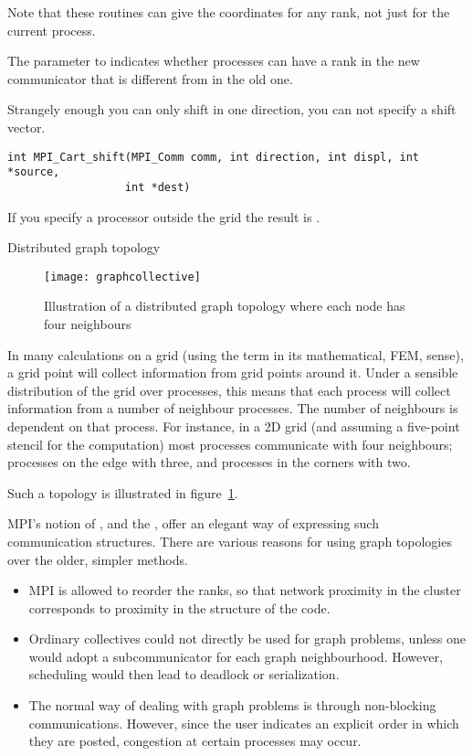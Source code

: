 Note that these routines can give the coordinates for any rank,
not just for the current process.
%

The  parameter to 
indicates whether processes can have a rank
in the new communicator that is different from in the old one.

Strangely enough you can only shift in one direction, you can not
specify a shift vector.
\begin{lstlisting}
int MPI_Cart_shift(MPI_Comm comm, int direction, int displ, int *source, 
                  int *dest)
\end{lstlisting}
If you specify a processor outside the grid
the result is .


 {Distributed graph topology}
\label{sec:mpi-dist-graph}

\begin{figure}
  \texttt{[image: graphcollective]}
  \caption{Illustration of a distributed graph topology where each
    node has four neighbours}
  \label{fig:graphcollective}
\end{figure}

In many calculations on a grid (using the term in its mathematical,
\ac{FEM}, sense), a grid point will collect information from grid
points around it. Under a sensible distribution of the grid over
processes, this means that each process will collect information from
a number of neighbour processes. The number of 
neighbours is dependent on that process. For instance, in a 2D
grid (and assuming a five-point stencil for the computation) most
processes communicate with four neighbours; processes on the edge with
three, and processes in the corners with two.

Such a topology is illustrated in figure~\ref{fig:graphcollective}.

MPI's notion of , and the
, offer an elegant way of
expressing such communication structures. There are various reasons
for using graph topologies over the older, simpler methods.
\begin{itemize}
\item MPI is allowed to reorder the ranks, so that network proximity
  in the cluster corresponds to proximity in the structure of the
  code.
\item Ordinary collectives could not directly be used for graph
  problems, unless one would adopt a subcommunicator for each graph
  neighbourhood. However, scheduling would then lead to deadlock or
  serialization.
\item The normal way of dealing with graph problems is through
  non-blocking communications. However, since the user indicates an
  explicit order in which they are posted, congestion at certain
  processes may occur.
\end{itemize}

